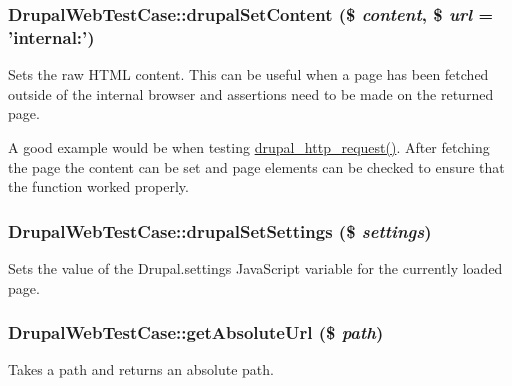 \hypertarget{classDrupalWebTestCase_a75c4e29bdb78951d61993b13985bad1c}{
\subsubsection[{drupalSetContent}]{\setlength{\rightskip}{0pt plus 5cm}DrupalWebTestCase::drupalSetContent (\$ {\em content}, \/  \$ {\em url} = {\ttfamily 'internal:'})}}
\label{classDrupalWebTestCase_a75c4e29bdb78951d61993b13985bad1c}
Sets the raw HTML content. This can be useful when a page has been fetched outside of the internal browser and assertions need to be made on the returned page.

A good example would be when testing \hyperlink{group__http__handling_gaad3affacd718b960300dcdddefa518aa}{drupal\_\-http\_\-request()}. After fetching the page the content can be set and page elements can be checked to ensure that the function worked properly. \hypertarget{classDrupalWebTestCase_aa6e1bac7cd3cdf0eb21c1656733534d2}{
\subsubsection[{drupalSetSettings}]{\setlength{\rightskip}{0pt plus 5cm}DrupalWebTestCase::drupalSetSettings (\$ {\em settings})}}
\label{classDrupalWebTestCase_aa6e1bac7cd3cdf0eb21c1656733534d2}
Sets the value of the Drupal.settings JavaScript variable for the currently loaded page. \hypertarget{classDrupalWebTestCase_ab170c2353296a22d88f4c7da58418d57}{
\subsubsection[{getAbsoluteUrl}]{\setlength{\rightskip}{0pt plus 5cm}DrupalWebTestCase::getAbsoluteUrl (\$ {\em path})}}
\label{classDrupalWebTestCase_ab170c2353296a22d88f4c7da58418d57}
Takes a path and returns an absolute path.


